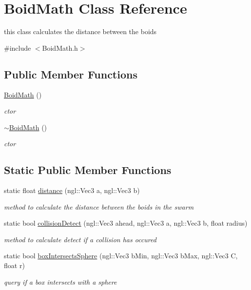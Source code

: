 \hypertarget{classBoidMath}{\section{Boid\-Math Class Reference}
\label{classBoidMath}
}


this class calculates the distance between the boids  




{\ttfamily \#include $<$Boid\-Math.\-h$>$}

\subsection*{Public Member Functions}
\begin{DoxyCompactItemize}
\item 
\hyperlink{classBoidMath_a96f701b19a18f2a07372f5eb50548e99}{Boid\-Math} ()
\begin{DoxyCompactList}\small\item\em ctor \end{DoxyCompactList}\item 
\hyperlink{classBoidMath_a1b7dfa1c968c08d4ed9ba03be75d91e0}{$\sim$\-Boid\-Math} ()
\begin{DoxyCompactList}\small\item\em ctor \end{DoxyCompactList}\end{DoxyCompactItemize}
\subsection*{Static Public Member Functions}
\begin{DoxyCompactItemize}
\item 
static float \hyperlink{classBoidMath_a1aaae5ede2b0287d2426a7a8d86adbd2}{distance} (ngl\-::\-Vec3 a, ngl\-::\-Vec3 b)
\begin{DoxyCompactList}\small\item\em method to calculate the distance between the boids in the swarm \end{DoxyCompactList}\item 
\hypertarget{classBoidMath_a555606e357d0021da57236ad97656d86}{static bool \hyperlink{classBoidMath_a555606e357d0021da57236ad97656d86}{collision\-Detect} (ngl\-::\-Vec3 ahead, ngl\-::\-Vec3 a, ngl\-::\-Vec3 b, float radius)}\label{classBoidMath_a555606e357d0021da57236ad97656d86}

\begin{DoxyCompactList}\small\item\em method to calculate detect if a collision has occured \end{DoxyCompactList}\item 
static bool \hyperlink{classBoidMath_a10348823145de6823516c6a78df0075d}{box\-Intersects\-Sphere} (ngl\-::\-Vec3 b\-Min, ngl\-::\-Vec3 b\-Max, ngl\-::\-Vec3 C, float r)
\begin{DoxyCompactList}\small\item\em query if a box intersects with a sphere \end{DoxyCompactList}\end{DoxyCompactItemize}


